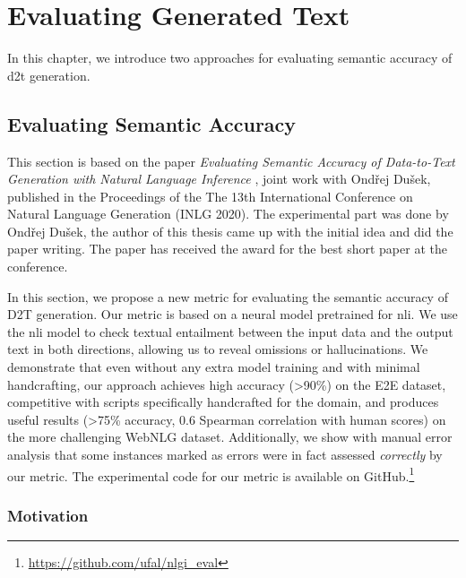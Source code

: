 
\chapter{Evaluating Generated Text}
\label{chap:evaluation}


In this chapter, we introduce two approaches for evaluating semantic accuracy of \ac{d2t} generation.

\section{Evaluating Semantic Accuracy}
\label{sec:sem-acc}

\begin{refbox}
    This section is based on the paper \emph{Evaluating Semantic Accuracy of Data-to-Text Generation with Natural Language Inference} \cite{dusekEvaluatingSemanticAccuracy2020}, joint work with Ondřej Dušek, published in the Proceedings of the The 13th International Conference on Natural Language Generation (INLG 2020). The experimental part was done by Ondřej Dušek, the author of this thesis came up with the initial idea and did the paper writing. The paper has received the award for the best short paper at the conference.
\end{refbox}

In this section, we propose a new metric for evaluating the semantic accuracy of D2T generation. Our metric is based on a neural model pretrained for \ac{nli}.
We use the \ac{nli} model to check textual entailment between the input data and the output text in both directions, allowing us to reveal omissions or hallucinations.
We demonstrate that even without any extra model training and with minimal handcrafting, our approach achieves high accuracy (>90\%) on the E2E dataset, competitive with scripts specifically handcrafted for the domain, and produces useful results (>75\% accuracy, 0.6 Spearman correlation with human scores) on the more challenging WebNLG dataset. Additionally, we show with manual error analysis that some instances marked as errors were in fact assessed \emph{correctly} by our metric. The experimental code for our metric is available on GitHub.\footnote{\url{https://github.com/ufal/nlgi_eval}}

\subsection{Motivation}

